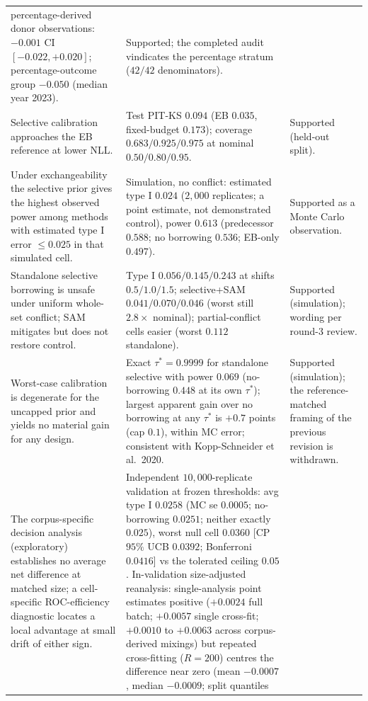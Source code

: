 \documentclass[11pt]{article}
\begin{document}
\begin{longtable}{p{} p{} p{}}
percentage-derived donor observations: $-0.001$ CI $[-0.022,+0.020]$;
percentage-outcome group $-0.050$ (median year 2023). & Supported; the
completed audit vindicates the percentage stratum ($42/42$ denominators). \\
Selective calibration approaches the EB reference at lower NLL. & Test PIT-KS
$0.094$ (EB $0.035$, fixed-budget $0.173$); coverage $0.683/0.925/0.975$ at
nominal $0.50/0.80/0.95$. & Supported (held-out split). \\
Under exchangeability the selective prior gives the highest observed power
among methods with estimated type I error $\le 0.025$ in that simulated
cell. & Simulation, no conflict: estimated type I $0.024$ ($2{,}000$
replicates; a point estimate, not demonstrated control), power
$0.613$ (predecessor $0.588$; no borrowing $0.536$; EB-only $0.497$). &
Supported as a Monte Carlo observation. \\
Standalone selective borrowing is unsafe under uniform whole-set conflict;
SAM mitigates but does not restore control. & Type I $0.056/0.145/0.243$ at
shifts $0.5/1.0/1.5$; selective+SAM $0.041/0.070/0.046$ (worst still
$2.8\times$ nominal); partial-conflict cells easier (worst $0.112$
standalone). & Supported (simulation); wording per round-3 review. \\
Worst-case calibration is degenerate for the uncapped prior and yields no
material gain for any design. & Exact $\tau^{*}=0.9999$ for standalone
selective with power $0.069$ (no-borrowing $0.448$ at its own $\tau^{*}$);
largest apparent gain over no borrowing at any $\tau^{*}$ is $+0.7$ points
(cap $0.1$), within MC error; consistent with Kopp-Schneider et al.\ 2020.
& Supported (simulation); the reference-matched framing of the previous
revision is withdrawn. \\
The corpus-specific decision analysis (exploratory) establishes no
average net difference at matched size; a cell-specific ROC-efficiency
diagnostic locates a local advantage at small drift of either sign. &
Independent $10{,}000$-replicate validation at frozen thresholds: avg type
I $0.0258$ (MC se $0.0005$; no-borrowing $0.0251$; neither exactly
$0.025$), worst null cell $0.0360$ [CP $95\%$ UCB $0.0392$; Bonferroni
$0.0416$] vs the tolerated ceiling $0.05$. In-validation size-adjusted
reanalysis: single-analysis point estimates positive ($+0.0024$ full
batch; $+0.0057$ single cross-fit; $+0.0010$ to $+0.0063$ across
corpus-derived mixings) but repeated cross-fitting ($R=200$) centres the
difference near zero (mean $-0.0007$, median $-0.0009$; split quantiles

\end{longtable}
\end{document}
